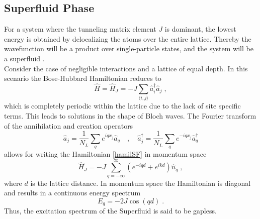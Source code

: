 \subsection{Superfluid Phase}
For a system where the tunneling matrix element $J$ is dominant, the lowest energy is obtained by delocalizing the atoms over the entire lattice. Thereby the wavefunction will be a product over single-particle states, and the system will be a superfluid \cite{greiner}.\\
Consider the case of negligible interactions and a lattice of equal depth. In this scenario the Bose-Hubbard Hamiltonian reduces to
\begin{equation}
	\hat{H} = \hat{H}_J = - J \sum_{\langle i,j \rangle} \hat{a}_{i}^{\dag} \hat{a}_{j} \; , 
	\label{hamilSF}
\end{equation}
which is completely periodic within the lattice due to the lack of site specific terms. This leads to solutions in the shape of Bloch waves. The Fourier transform of the annihilation and creation operators
\begin{equation}
	\hat{a}_j = \frac{1}{N_L} \sum_{q}  e^{i q x_j} \hat{a}_q \quad , \quad
	\hat{a}_{j}^{\dag} = \frac{1}{N_L} \sum_{q}  e^{-i q x_j} \hat{a}_{q}^{\dag}
\end{equation}
allows for writing the Hamiltonian \eqref{hamilSF} in momentum space
\begin{equation}
	\hat{H}_J = - J \sum_{q = - \infty}^{\infty} \left( e^{- i q d } + e^{i k d} \right) \hat{n}_q \; ,
\end{equation}
where $d$ is the lattice distance. In momentum space the Hamiltonian is diagonal and results in a continuous energy spectrum
\begin{equation}
	E_q = -2 J \cos(q d) \; .
	\label{SFenergy}
\end{equation}
Thus, the excitation spectrum of the Superfluid is said to be gapless.

